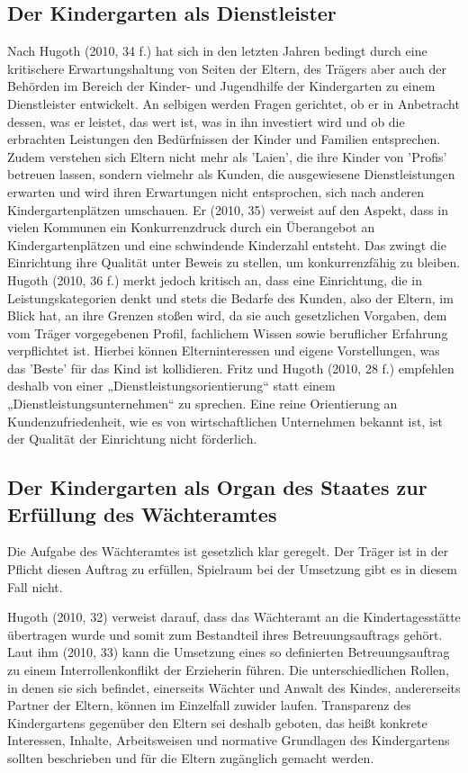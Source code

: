 \subsection{Der Kindergarten als Dienstleister}
Nach Hugoth (2010, 34 f.) hat sich in den letzten Jahren bedingt durch eine kritischere Erwartungshaltung von Seiten der Eltern, des Trägers aber auch der Behörden im Bereich der Kinder- und Jugendhilfe der Kindergarten zu einem Dienstleister entwickelt. An selbigen werden  Fragen gerichtet, ob er in Anbetracht dessen, was er leistet, das wert ist, was in ihn investiert wird und ob die erbrachten Leistungen den Bedürfnissen der Kinder und Familien entsprechen. Zudem verstehen sich Eltern nicht mehr als 'Laien', die ihre Kinder von 'Profis' betreuen lassen, sondern vielmehr als Kunden, die ausgewiesene Dienstleistungen erwarten und wird ihren Erwartungen nicht entsprochen, sich nach anderen Kindergartenplätzen umschauen. Er (2010, 35) verweist auf den Aspekt, dass in vielen Kommunen ein Konkurrenzdruck durch ein Überangebot an Kindergartenplätzen und eine schwindende Kinderzahl entsteht. Das zwingt die Einrichtung ihre Qualität unter Beweis zu stellen, um konkurrenzfähig zu bleiben. 
Hugoth (2010, 36 f.) merkt jedoch kritisch an, dass eine Einrichtung, die in Leistungskategorien denkt und stets die Bedarfe des Kunden, also der Eltern, im Blick hat, an ihre Grenzen stoßen wird, da sie auch gesetzlichen Vorgaben, dem vom Träger vorgegebenen Profil, fachlichem Wissen sowie beruflicher Erfahrung verpflichtet ist. Hierbei können Elterninteressen und eigene Vorstellungen, was das 'Beste' für das Kind ist kollidieren. Fritz und Hugoth (2010, 28 f.) empfehlen deshalb von einer „Dienstleistungsorientierung“ statt einem „Dienstleistungsunternehmen“ zu sprechen. Eine reine Orientierung an Kundenzufriedenheit, wie es von wirtschaftlichen Unternehmen bekannt ist, ist der Qualität der Einrichtung nicht förderlich. 

\subsection{Der Kindergarten als Organ des Staates zur Erfüllung des Wächteramtes}
Die Aufgabe des Wächteramtes ist gesetzlich klar geregelt. Der Träger ist in der Pflicht diesen Auftrag zu erfüllen, Spielraum bei der Umsetzung gibt es in diesem Fall nicht.
 
Hugoth (2010, 32) verweist darauf, dass das Wächteramt an die Kindertagesstätte übertragen wurde und somit zum Bestandteil ihres Betreuungsauftrags gehört. Laut ihm (2010, 33) kann die Umsetzung eines so definierten Betreuungsauftrag zu einem Interrollenkonflikt der Erzieherin führen. Die unterschiedlichen Rollen, in denen sie sich befindet, einerseits Wächter und Anwalt des Kindes, andererseits Partner der Eltern, können im Einzelfall zuwider laufen. Transparenz des Kindergartens gegenüber den Eltern sei deshalb geboten, das heißt konkrete Interessen, Inhalte, Arbeitsweisen und normative Grundlagen des Kindergartens sollten beschrieben und für die Eltern zugänglich gemacht werden. 

